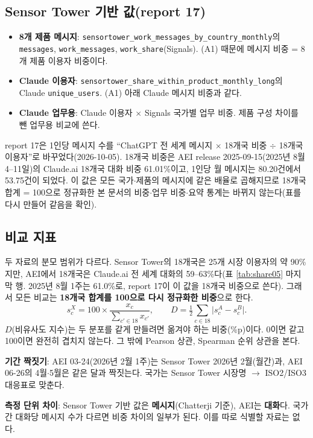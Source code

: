 \documentclass[11pt]{article}
\begin{document}
\subsection{Sensor Tower 기반 값(report 17)}
\begin{itemize}
  \item \textbf{8개 제품 메시지}: \texttt{sensortower\_work\_messages\_by\_country\_monthly}의 \texttt{messages}, \texttt{work\_messages}, \texttt{work\_share}(Signals). (A1) 때문에 메시지 비중 = 8개 제품 이용자 비중이다.
  \item \textbf{Claude 이용자}: \texttt{sensortower\_share\_within\_product\_monthly\_long}의 Claude \texttt{unique\_users}. (A1) 아래 Claude 메시지 비중과 같다.
  \item \textbf{Claude 업무용}: Claude 이용자 $\times$ Signals 국가별 업무 비중. 제품 구성 차이를 뺀 업무용 비교에 쓴다.
\end{itemize}
report 17은 1인당 메시지 수를 ``ChatGPT 전 세계 메시지 $\times$ 18개국 비중 $\div$ 18개국 이용자''로 바꾸었다(2026-10-05). 18개국 비중은 AEI release 2025-09-15(2025년 8월 4--11일)의 Claude.ai 18개국 대화 비중 61.01\%이고, 1인당 월 메시지는 80.20건에서 53.75건이 되었다. 이 값은 모든 국가$\cdot$제품의 메시지에 같은 배율로 곱해지므로 18개국 합계 = 100으로 정규화한 본 문서의 비중$\cdot$업무 비중$\cdot$요약 통계는 바뀌지 않는다(표를 다시 만들어 같음을 확인).

\subsection{비교 지표}
두 자료의 분모 범위가 다르다. Sensor Tower의 18개국은 25개 시장 이용자의 약 90\%지만, AEI에서 18개국은 Claude.ai 전 세계 대화의 59--63\%다(표 \ref{tab:share05} 마지막 행. 2025년 8월 1주는 61.0\%로, report 17이 이 값을 18개국 비중으로 쓴다). 그래서 모든 비교는 \textbf{18개국 합계를 100으로 다시 정규화한 비중}으로 한다.
\[
  s^{X}_{c} = 100 \times \frac{x_c}{\sum_{c' \in 18} x_{c'}}, \qquad
  D = \tfrac12 \sum_{c \in 18} \bigl| s^{A}_{c} - s^{B}_{c} \bigr| .
\]
$D$(비유사도 지수)는 두 분포를 같게 만들려면 옮겨야 하는 비중(\%p)이다. 0이면 같고 100이면 완전히 겹치지 않는다. 그 밖에 Pearson 상관, Spearman 순위 상관을 본다.

\textbf{기간 짝짓기}: AEI 03-24(2026년 2월 1주)는 Sensor Tower 2026년 2월(월간)과, AEI 06-26의 4월$\cdot$5월은 같은 달과 짝짓는다. 국가는 Sensor Tower 시장명 $\to$ ISO2/ISO3 대응표로 맞춘다.

\textbf{측정 단위 차이}: Sensor Tower 기반 값은 \textbf{메시지}(Chatterji 기준), AEI는 \textbf{대화}다. 국가 간 대화당 메시지 수가 다르면 비중 차이의 일부가 된다. 이를 따로 식별할 자료는 없다.
\end{document}
